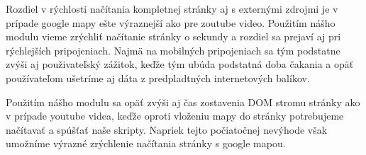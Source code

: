 Rozdiel v rýchlosti načítania kompletnej stránky aj s externými zdrojmi je v prípade google mapy ešte výraznejší ako pre zoutube video. Použitím nášho modulu vieme zrýchliť načítanie stránky o sekundy a rozdiel sa prejaví aj pri rýchlejších pripojeniach. Najmä na mobilných pripojeniach sa tým podstatne zvýši aj použivateľský zážitok, keďže tým ubúda podstatná doba čakania a opäť používateľom ušetríme aj dáta z predpladtných internetových balíkov.


Použitím nášho modulu sa opäť zvýši aj čas zostavenia DOM stromu stránky ako v prípade youtube videa, keďže oproti vloženiu mapy do stránky potrebujeme načítavať a spúšťať naše skripty. Napriek tejto počiatočnej nevýhode však umožníme výrazné zrýchlenie načítania stránky s google mapou.

